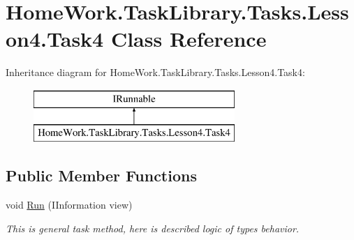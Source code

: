 \hypertarget{class_home_work_1_1_task_library_1_1_tasks_1_1_lesson4_1_1_task4}{}\section{Home\+Work.\+Task\+Library.\+Tasks.\+Lesson4.\+Task4 Class Reference}
\label{class_home_work_1_1_task_library_1_1_tasks_1_1_lesson4_1_1_task4}
Inheritance diagram for Home\+Work.\+Task\+Library.\+Tasks.\+Lesson4.\+Task4\+:\begin{figure}[H]
\begin{center}
\leavevmode
\includegraphics[height=2.000000cm]{class_home_work_1_1_task_library_1_1_tasks_1_1_lesson4_1_1_task4}
\end{center}
\end{figure}
\subsection*{Public Member Functions}
\begin{DoxyCompactItemize}
\item 
void \mbox{\hyperlink{class_home_work_1_1_task_library_1_1_tasks_1_1_lesson4_1_1_task4_a8d4e9f04920646847e14b417d3d166ed}{Run}} (I\+Information view)
\begin{DoxyCompactList}\small\item\em This is general task method, here is described logic of types behavior. \end{DoxyCompactList}\end{DoxyCompactItemize}
